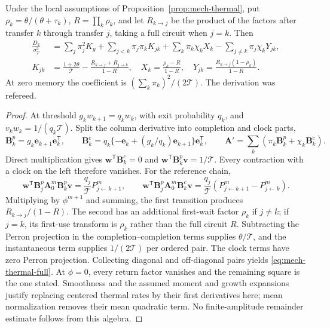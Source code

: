 \begin{lemma}\label{lem:mech-thermal-full}
Under the local assumptions of Proposition~\ref{prop:mech-thermal}, put \(\rho_k=\theta/(\theta+\tau_k)\), \(R=\prod_k\rho_k\), and let \(R_{k\to j}\) be the product of the factors after transfer \(k\) through transfer \(j\), taking a full circuit when \(j=k\). Then
\begin{align}
 \frac{D_2}{\sigma_T^2}
 &=\sum_j\pi_j^2K_g+\sum_{j<k}\pi_j\pi_kK_{jk}
 +\sum_k\pi_k\chi_kX_k-\sum_{j\ne k}\pi_j\chi_kY_{jk},\label{eq:mech-thermal-full}\\
 K_{jk}&=\frac{1+2\theta}{\mathcal T}-\frac{R_{k\to j}+R_{j\to k}}{1-R},\quad
 X_k=\frac{\rho_k-R}{1-R},\quad
 Y_{jk}=\frac{R_{k\to j}(1-\rho_k)}{1-R}.\nonumber
\end{align}
At zero memory the coefficient is \((\sum_k\pi_k)^2/(2\mathcal T)\). The derivation was refereed.
\end{lemma}
\begin{proof}
At threshold \(g_kw_{k+1}=q_kw_k\), with exit probability \(q_k\), and \(v_kw_k=1/(q_k\mathcal T)\). Split the column derivative into completion and clock parts,
\[
 \mathbf B_k^p=g_k\mathbf e_{k+1}\mathbf e_k^{\mathsf T},\qquad
 \mathbf B_k^c=q_k\{-\mathbf e_k+(g_k/q_k)\mathbf e_{k+1}\}\mathbf e_k^{\mathsf T},
 \qquad \mathbf A'=
 \sum_k(\pi_k\mathbf B_k^p+\chi_k\mathbf B_k^c).
\]
Direct multiplication gives \(\mathbf w^{\mathsf T}\mathbf B_k^c=0\) and \(\mathbf w^{\mathsf T}\mathbf B_k^p\mathbf v=1/\mathcal T\). Every contraction with a clock on the left therefore vanishes. For the reference chain,
\[
 \mathbf w^{\mathsf T}\mathbf B_j^p\mathbf A_0^m\mathbf B_k^p\mathbf v
 =\frac{q_j}{\mathcal T}P^m_{j\leftarrow k+1},\qquad
 \mathbf w^{\mathsf T}\mathbf B_j^p\mathbf A_0^m\mathbf B_k^c\mathbf v
 =\frac{q_j}{\mathcal T}(P^m_{j\leftarrow k+1}-P^m_{j\leftarrow k}).
\]
Multiplying by \(\phi^{m+1}\) and summing, the first transition produces \(R_{k\to j}/(1-R)\). The second has an additional first-wait factor \(\rho_k\) if \(j\ne k\); if \(j=k\), its first-use transform is \(\rho_k\) rather than the full circuit \(R\). Subtracting the Perron projection in the completion--completion terms supplies \(\theta/\mathcal T\), and the instantaneous term supplies \(1/(2\mathcal T)\) per ordered pair. The clock terms have zero Perron projection. Collecting diagonal and off-diagonal pairs yields \eqref{eq:mech-thermal-full}. At \(\phi=0\), every return factor vanishes and the remaining square is the one stated. Smoothness and the assumed moment and growth expansions justify replacing centered thermal rates by their first derivatives here; mean normalization removes their mean quadratic term. No finite-amplitude remainder estimate follows from this algebra.
\end{proof}

